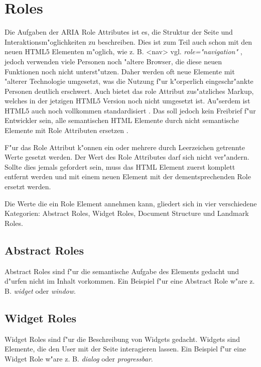 \documentclass[a4paper,bibtotoc,oneside]{scrbook}
\begin{document}
\section{Roles}
Die Aufgaben der ARIA Role Attributes ist es, die Struktur der Seite und Interaktionsm"oglichkeiten zu beschreiben. Dies ist zum Teil auch schon mit den neuen HTML5 Elementen m"oglich, wie z. B. <nav> \cite[Abschnitt 4.4.3]{html5} vgl. \emph{role="navigation"} \cite[Abschnitt 3.1]{xhtml_vocab}, jedoch verwenden viele Personen noch "altere Browser, die diese neuen Funktionen noch nicht unterst"utzen. Daher werden oft neue Elemente mit "alterer Technologie umgesetzt, was die Nutzung f"ur k"orperlich eingeschr"ankte Personen deutlich erschwert. Auch bietet das role Attribut zus"atzliches Markup, welches in der jetzigen HTML5 Version noch nicht umgesetzt ist. Au"serdem ist HTML5 auch noch vollkommen standardisiert \cite{html5}. Das soll jedoch kein Freibrief f"ur Entwickler sein, alle semantischen HTML Elemente durch nicht semantische Elemente mit Role Attributen ersetzen \cite[Abschnitt 3]{roles}. 

F"ur das Role Attribut k"onnen ein oder mehrere durch Leerzeichen getrennte Werte gesetzt werden. Der Wert des Role Attributes darf sich nicht ver"andern. Sollte dies jemals gefordert sein, muss das HTML Element zuerst komplett entfernt werden und mit einem neuen Element mit der dementsprechenden Role ersetzt werden.\cite[Abschnitt 5]{aria_roles}

Die Werte die ein Role Element annehmen kann, gliedert sich in vier verschiedene Kategorien: Abstract Roles, Widget Roles, Document Structure und Landmark Roles. \cite[Abschnitt 5.2]{aria_states}


\subsection{Abstract Roles}
Abstract Roles sind f"ur die semantische Aufgabe des Elements gedacht und d"urfen nicht im Inhalt vorkommen. Ein Beispiel f"ur eine Abstract Role w"are z. B. \emph{widget} oder \emph{window}.\cite[Abschnitt 5.3.1]{aria_roles}

\subsection{Widget Roles}
Widget Roles sind f"ur die Beschreibung von Widgets gedacht. Widgets sind Elemente, die den User mit der Seite interagieren lassen\cite[Abschnitt 5.4, widget]{aria_roles}. Ein Beispiel f"ur eine Widget Role w"are z. B. \emph{dialog} oder \emph{progressbar}.\cite[Abschnitt 5.3.2]{aria_roles}
\end{document}

